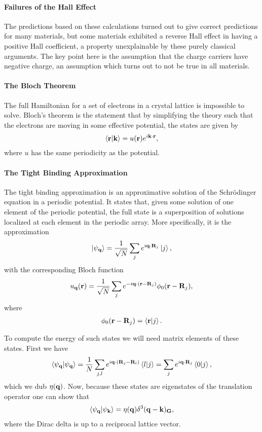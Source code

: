 \paragraph{Failures of the Hall Effect}
The predictions based on these calculations turned out to give correct predictions for many materials, but some materials exhibited a reverse Hall effect in having a positive Hall coefficient, a property unexplainable by these purely classical arguments. The key point here is the assumption that the charge carriers have negative charge, an assumption which turns out to not be true in all materials.

\paragraph{The Bloch Theorem}
The full Hamiltonian for a set of electrons in a crystal lattice is impossible to solve. Bloch's theorem is the statement that by simplifying the theory such that the electrons are moving in some effective potential, the states are given by
\begin{align*}
	\braket{\vb{r}}{\vb{k}} = u(\vb{r})e^{i\vb{k}\cdot\vb{r}},
\end{align*}
where $u$ has the same periodicity as the potential.

\paragraph{The Tight Binding Approximation}
The tight binding approximation is an approximative solution of the Schrödinger equation in  a periodic potential. It states that, given some solution of one element of the periodic potential, the full state is a superposition of solutions localized at each element in the periodic array. More specifically, it is the approximation
\begin{align*}
	\ket{\psi_{\vb{q}}} = \frac{1}{\sqrt{N}}\sum\limits_{j}e^{i\vb{q}\cdot\vb{R}_{j}}\ket{j},
\end{align*}
with the corresponding Bloch function
\begin{align*}
	u_{\vb{q}}(\vb{r}) = \frac{1}{\sqrt{N}}\sum\limits_{j}e^{-i\vb{q}\cdot(\vb{r} - \vb{R}_{j})}\phi_{0}(\vb{r} - \vb{R}_{j}),
\end{align*}
where
\begin{align*}
	\phi_{0}(\vb{r} - \vb{R}_{j}) = \braket{\vb{r}}{j}.
\end{align*}

To compute the energy of such states we will need matrix elements of these states. First we have
\begin{align*}
	\braket{\psi_{\vb{q}}} = \frac{1}{N}\sum\limits_{j, l}e^{i\vb{q}\cdot(\vb{R}_{j} - \vb{R}_{l})}\braket{l}{j} = \sum\limits_{j}e^{i\vb{q}\cdot\vb{R}_{j}}\braket{0}{j},
\end{align*}
which we dub $\eta(\vb{q})$. Now, because these states are eigenstates of the translation operator one can show that
\begin{align*}
	\braket{\psi_{\vb{q}}}{\psi_{\vb{k}}} = \eta(\vb{q})\delta^{3}(\vb{q} - \vb{k})_{\vb{G}},
\end{align*}
where the Dirac delta is up to a reciprocal lattice vector.